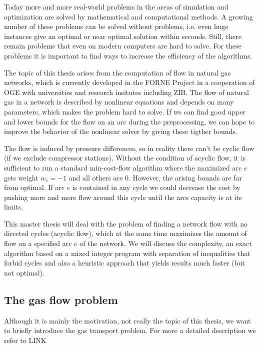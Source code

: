 
Today more and more real-world problems in the areas of simulation and optimization are solved by mathematical and 
computational methods. A growing number of these problems can be solved without problems, i.e. even huge instances give 
an optimal or near optimal solution within seconds. Still, there remain problems that even on modern computers are hard 
to solve. For these problems it is important to find ways to increase the efficiency of the algorithms. 

The topic of this thesis arises from the computation of flow in natural gas networks, which is currently developed 
in the FORNE Project in a cooperation of OGE with universities and research insitutes including ZIB.
The flow of natural gas in a network is described by nonlinear equations and depends on many parameters, which makes 
the problem hard to solve. If we can find good upper and lower bounds for the flow on an arc during the preprocessing, 
we can hope to improve the behavior of the nonlinear solver by giving these tigther bounds. 

The flow is induced by pressure differences, so in reality there can't be cyclic flow (if we exclude compressor 
stations). Without the condition of acyclic flow, it is sufficient to run a standard min-cost-flow algorithm where the 
maximized arc $e$ gets weight $w_e = -1$ and all others are 0. However, the arising bounds are far from optimal. If arc 
$e$ is contained in any cycle we could decrease the cost by pushing more and more flow around this cycle until the arcs 
capacity is at its limits.

This master thesis will deal with the problem of finding a network flow with no directed cycles (acyclic flow), which at 
the same time maximizes the amount of flow on a specified arc $e$ of the network. We will discuss the complexity, an 
exact algorithm based on a mixed integer program with separation of inequalities that forbid cycles and also a heuristic 
approach that yields results much faster (but not optimal).%

\subsection{The gas flow problem}
Although it is mainly the motivation, not really the topic of this thesis, we want to briefly introduce the gas 
transport problem. For more a detailed description we refer to LINK %